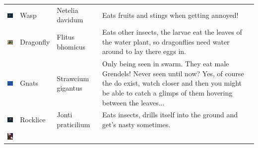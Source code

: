\documentclass[11pt,twoside,a4paper]{article}
\begin{document}
\begin{longtable}{ p{1.60cm} p{1.95cm} p{2.55cm} p{11.00cm} }
	\begin{minipage}[ht]{1.55cm} \includegraphics[width=1.50cm]{img/wespe.jpg} \end{minipage}		
																&	Wasp			&	Netelia davidum		
																&	Eats fruits and stings when getting annoyed!	\\
	\begin{minipage}[ht]{1.55cm} \includegraphics[width=1.50cm]{img/libelle.jpg} \end{minipage}		
																&	Dragonfly		&	Flitus \newline bhomicus		
																&	Eats other insects, the larvae eat the leaves of the water plant, so dragonflies need water around to lay there eggs in.	\\
	\begin{minipage}[ht]{1.55cm} \includegraphics[width=1.50cm]{img/gnats.jpg} \end{minipage}		
																&	Gnats			&	Strawcium \newline gigantus		
																&	Only being seen in swarm. They eat male Grendels! Never seen until now? Yes, of course the do exist, watch closer and then you might be able to catch a glimps of them hovering between the leaves...	\\
	\begin{minipage}[ht]{1.55cm} \includegraphics[width=1.50cm]{img/lice.jpg} \end{minipage}		
																&	Rocklice		&	Jonti \newline praticilium		
																&	Eats insects, drills itself into the ground and get's nasty sometimes.	\\
	\begin{minipage}[ht]{1.55cm} \includegraphics[width=1.50cm]{img/kobold.jpg} \end{minipage}		

\end{longtable}
\end{document}
